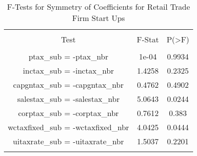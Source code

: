 
\begin{table}[!htbp] \centering 
  \caption{F-Tests for Symmetry of Coefficients for Retail Trade Firm Start Ups} 
  \label{44-45Ftests} 
\begin{tabular}{@{\extracolsep{5pt}} ccc} 
\\[-1.8ex]\hline 
\hline \\[-1.8ex] 
Test & F-Stat & P(\textgreater F) \\ 
\hline \\[-1.8ex] 
ptax\_sub = -ptax\_nbr & 1e-04 & 0.9934 \\ 
inctax\_sub = -inctax\_nbr & 1.4258 & 0.2325 \\ 
capgntax\_sub = -capgntax\_nbr & 0.4762 & 0.4902 \\ 
salestax\_sub = -salestax\_nbr & 5.0643 & 0.0244 \\ 
corptax\_sub = -corptax\_nbr & 0.7612 & 0.383 \\ 
wctaxfixed\_sub = -wctaxfixed\_nbr & 4.0425 & 0.0444 \\ 
uitaxrate\_sub = -uitaxrate\_nbr & 1.5037 & 0.2201 \\ 
\hline \\[-1.8ex] 
\end{tabular} 
\end{table} 
